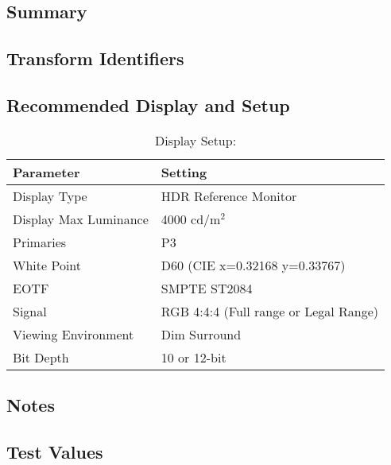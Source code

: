 \section[P3-D60 ST2084 (4000 nits)]{\shortName{}}
\label{sec:odt-details-\id}

\subsection{Summary}
\label{subsec:summary-\id}

\lipsum[1-2] %

\subsection{Transform Identifiers} 
\label{subsec:odt-ident-\id}

\subsection{Recommended Display and Setup}
\label{subsec:setup-\id}

\begin{table}[ht!]
    \centering
        \begin{tabular}{|p{1.5in}|p{3in}|}
            \hline
            \textbf{Parameter} 		& 	\textbf{Setting} 				 		\\ \hline
            Display Type 			&	HDR Reference Monitor					\\ \hline
            Display Max Luminance 	& 	4000 cd/m$^2$							\\ \hline
            Primaries	 			& 	P3										\\ \hline
            White Point	 			& 	D60 (CIE x=0.32168 y=0.33767)			\\ \hline
            EOTF					& 	SMPTE ST2084		 					\\ \hline
            Signal 					&	RGB 4:4:4 (Full range or Legal Range)	\\ \hline
            Viewing Environment 	& 	Dim Surround 							\\ \hline
            Bit Depth 				& 	10 or 12-bit	 						\\ \hline 
    \end{tabular}
    \caption{Display Setup: \shortName{}} 
    \label{tab:setup-\id}
\end{table}

\subsection{Notes}
\label{subsec:notes-\id}

\lipsum[1-2] %


\subsection{Test Values}
\label{subsec:testValues-\id}

\testValuesSubSec{}
